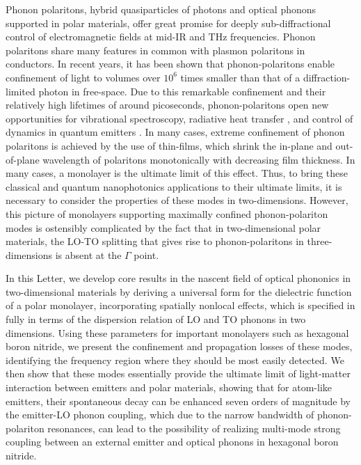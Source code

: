 \documentclass[aps,prb,twocolumn,
	groupedaddress,superscriptaddress,
	amsfonts,amssymb,amsmath,floatfix,
	citeautoscript]{revtex4-1}
\begin{document}
Phonon polaritons, hybrid quasiparticles of photons and optical phonons supported in polar materials, offer great promise for deeply sub-diffractional control of electromagnetic fields at mid-IR and THz frequencies. Phonon polaritons share many features in common with plasmon polaritons in conductors. In recent years, it has been shown that phonon-polaritons enable confinement of light to volumes over $10^6$ times smaller than that of a diffraction-limited photon in free-space\cite{caldwell2013low,xu2014mid,caldwell2014sub,dai2014tunable,tomadin2015accessing,yoxall2015direct,li2015hyperbolic,dai2015subdiffractional,dai2015graphene,caldwell2015low,li2016reversible,Basov:2016,basov2017towards,low2017polaritons,giles2017ultra}. Due to this remarkable confinement and their relatively high lifetimes of around picoseconds, phonon-polaritons open new opportunities for vibrational spectroscopy, radiative heat transfer \cite{hillenbrand2002phonon}, and control of dynamics in quantum emitters \cite{kumar2015tunable,rivera2017making,kurman2018control}. In many cases, extreme confinement of phonon polaritons is achieved by the use of thin-films, which shrink the in-plane and out-of-plane wavelength of polaritons monotonically with decreasing film thickness. In many cases, a monolayer is the ultimate limit of this effect. Thus, to bring these classical and quantum nanophotonics applications to their ultimate limits, it is necessary to consider the properties of these modes in two-dimensions. However, this picture of monolayers supporting maximally confined phonon-polariton modes is ostensibly complicated by the fact that in two-dimensional polar materials, the LO-TO splitting that gives rise to phonon-polaritons in three-dimensions is absent at the $\Gamma$ point.

In this Letter, we develop core results in the nascent field of optical phononics in two-dimensional materials by deriving a universal form for the dielectric function of a polar monolayer, incorporating spatially nonlocal effects, which is specified in fully in terms of the dispersion relation of LO and TO phonons in two dimensions. Using these parameters for important monolayers such as hexagonal boron nitride, we present the confinement and propagation losses of these modes, identifying the frequency region where they should be most easily detected. We then show that these modes essentially provide the ultimate limit of light-matter interaction between emitters and polar materials, showing that for atom-like emitters, their spontaneous decay can be enhanced seven orders of magnitude by the emitter-LO phonon coupling, which due to the narrow bandwidth of phonon-polariton resonances, can lead to the possibility of realizing multi-mode strong coupling between an external emitter and optical phonons in hexagonal boron nitride. 
\end{document}
